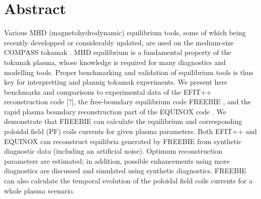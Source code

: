 \section{Abstract}

Various MHD (magnetohydrodynamic) equilibrium tools, some of which being recently developped or considerably updated, are used on the medium-size COMPASS tokamak \cite{doi:10.1007/s10582-006-0188-1}. MHD equilibrium is a fundamental property of the tokamak plasma, whose knowledge is required for many diagnostics and modelling tools. Proper benchmarking and validation of equilibrium tools is thus key for interpretting and plannig tokamak experiments. We present here benchmarks and comparisons to experimental data of the EFIT++ reconstruction code [?], the free-boundary equilibrium code FREEBIE \cite{freebie2012}, and the rapid plasma boundary reconstruction part of the EQUINOX code \cite{doi:10.1016/j.jcp.2011.04.005}. We demonstrate that FREEBIE can calculate the equilibrium and corresponding poloidal field (PF) coils currents for given plasma parameters. Both EFIT++ and EQUINOX can reconstruct equilibria generated by FREEBIE from synthetic diagnostic data (including an artificial noise). Optimum reconstruction parameters are estimated; in addition, possible enhancements using more diagnostics are discussed and simulated using synthetic diagnostics. FREEBIE can also calculate the temporal evolution of the poloidal field coils currents for a whole plasma scenario.

